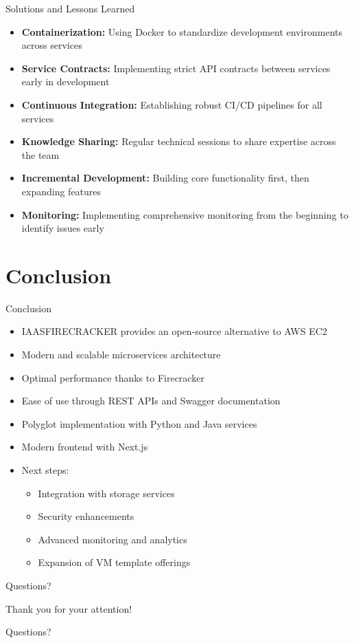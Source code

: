 \documentclass{beamer}
\begin{document}
\begin{frame}{Solutions and Lessons Learned}
  \begin{itemize}
    \item \textbf{Containerization:} Using Docker to standardize development environments across services
    \item \textbf{Service Contracts:} Implementing strict API contracts between services early in development
    \item \textbf{Continuous Integration:} Establishing robust CI/CD pipelines for all services
    \item \textbf{Knowledge Sharing:} Regular technical sessions to share expertise across the team
    \item \textbf{Incremental Development:} Building core functionality first, then expanding features
    \item \textbf{Monitoring:} Implementing comprehensive monitoring from the beginning to identify issues early
  \end{itemize}
\end{frame}

\section{Conclusion}

\begin{frame}{Conclusion}
  \begin{itemize}
    \item IAASFIRECRACKER provides an open-source alternative to AWS EC2
    \item Modern and scalable microservices architecture
    \item Optimal performance thanks to Firecracker
    \item Ease of use through REST APIs and Swagger documentation
    \item Polyglot implementation with Python and Java services
    \item Modern frontend with Next.js
    \item Next steps: 
      \begin{itemize}
        \item Integration with storage services
        \item Security enhancements
        \item Advanced monitoring and analytics
        \item Expansion of VM template offerings
      \end{itemize}
  \end{itemize}
\end{frame}

\begin{frame}{Questions?}
  \begin{center}
    \huge{Thank you for your attention!}
    
    \vspace{1cm}
    
    \large{Questions?}
  \end{center}
\end{frame}
\end{document}
